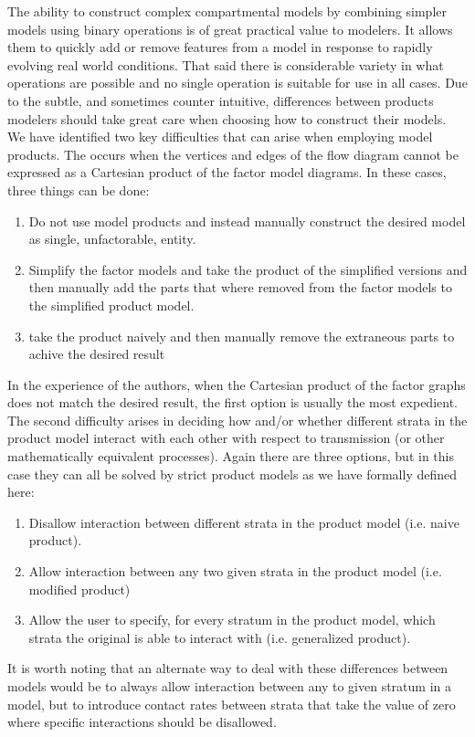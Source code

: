 The ability to construct complex compartmental models by combining simpler models using binary operations is of great practical value to modelers. It allows them to quickly add or remove features from a model in response to rapidly evolving real world conditions. That said there is considerable variety in what operations are possible and no single operation is suitable for use in all cases. Due to the subtle, and sometimes counter intuitive, differences between products modelers should take great care when choosing how to construct their models. We have identified two key difficulties that can arise when employing model products. The occurs when the vertices and edges of the flow diagram cannot be expressed as a Cartesian product of the factor model diagrams. In these cases, three things can be done: 
\begin{enumerate}
    \item Do not use model products and instead manually construct the desired model as single, unfactorable, entity.
    \item Simplify the factor models and take the product of the simplified versions and then manually add the parts that where removed from the factor models to the simplified product model.
    \item take the product naively and then manually remove the extraneous parts to achive the desired result
\end{enumerate}
In the experience of the authors, when the Cartesian product of the factor graphs does not match the desired result, the first option is usually the most expedient. The second difficulty arises in deciding how and/or whether 
 different strata in the product model interact with each other with respect to transmission (or other mathematically equivalent processes). Again there are three options, but in this case they can all be solved by strict product models as we have formally defined here: 
\begin{enumerate}
    \item Disallow interaction between different strata in the product model (i.e. naive product). 
    \item Allow interaction between any two given strata in the product model (i.e. modified product)
    \item Allow the user to specify, for every stratum in the product model, which strata the original is able to interact with (i.e. generalized product).
\end{enumerate}
It is worth noting that an alternate way to deal with these differences between models would be to always allow interaction between any to given stratum in a model, but to introduce contact rates between strata that take the value of zero where specific interactions should be disallowed.
